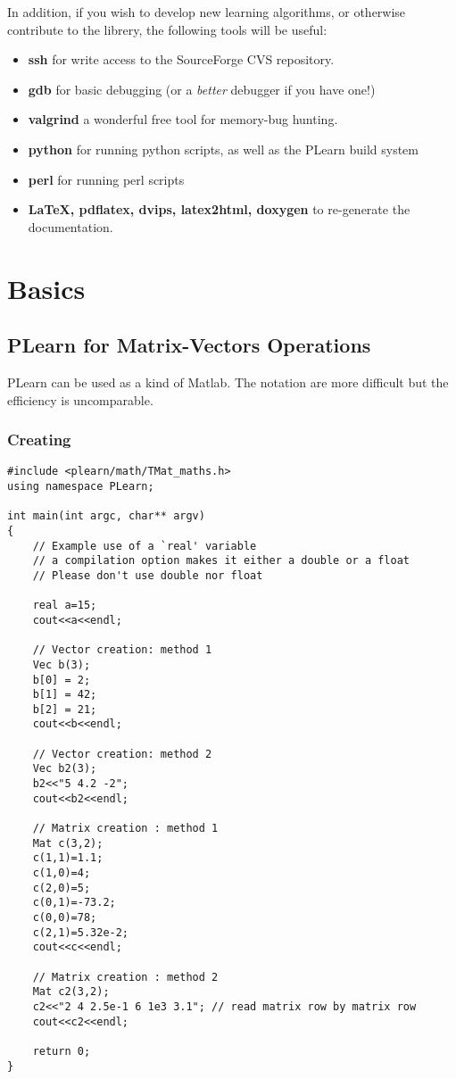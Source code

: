 \documentclass[11pt]{book}
\begin{document}
In addition, if you wish to develop new learning algorithms, or otherwise
 contribute to the librery, the following tools will be useful:
\begin{itemize}
\item {\bf ssh} for write access to the SourceForge CVS repository.
\item {\bf gdb} for basic debugging (or a {\em better} debugger if you have one!)
\item {\bf valgrind} a wonderful free tool for memory-bug hunting.
\item {\bf python} for running python scripts, as well as the PLearn build system
\item {\bf perl} for running perl scripts
\item {\bf LaTeX, pdflatex, dvips, latex2html, doxygen} to re-generate the documentation. 
\end{itemize}



\chapter{Basics}

\section{PLearn for Matrix-Vectors Operations}

PLearn can be used as a kind of Matlab. The notation are more
difficult but the efficiency is uncomparable.

\subsection{Creating}

\begin{verbatim}
#include <plearn/math/TMat_maths.h>
using namespace PLearn;

int main(int argc, char** argv)
{
    // Example use of a `real' variable
    // a compilation option makes it either a double or a float
    // Please don't use double nor float

    real a=15;
    cout<<a<<endl;

    // Vector creation: method 1
    Vec b(3);
    b[0] = 2;
    b[1] = 42;
    b[2] = 21;
    cout<<b<<endl;

    // Vector creation: method 2
    Vec b2(3);
    b2<<"5 4.2 -2";
    cout<<b2<<endl;

    // Matrix creation : method 1
    Mat c(3,2);
    c(1,1)=1.1;
    c(1,0)=4;
    c(2,0)=5;
    c(0,1)=-73.2;
    c(0,0)=78;
    c(2,1)=5.32e-2;
    cout<<c<<endl;

    // Matrix creation : method 2
    Mat c2(3,2);
    c2<<"2 4 2.5e-1 6 1e3 3.1"; // read matrix row by matrix row 
    cout<<c2<<endl;

    return 0;
}
\end{verbatim}
\end{document}
